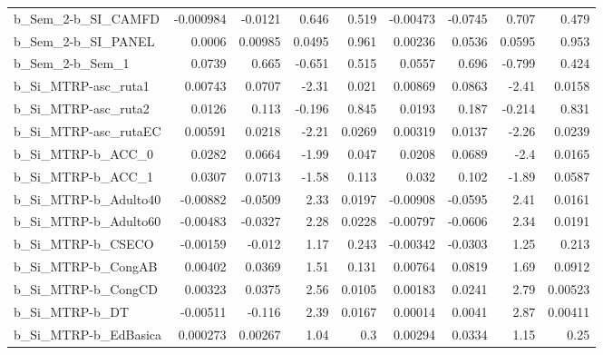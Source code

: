 \begin{tabular}{lrrrrrrrr}
b\_Sem\_2-b\_SI\_CAMFD         &   -0.000984 &      -0.0121 &     0.646 &    0.519 &   -0.00473 &     -0.0745 &        0.707 &         0.479 \\
b\_Sem\_2-b\_SI\_PANEL         &      0.0006 &      0.00985 &    0.0495 &    0.961 &    0.00236 &      0.0536 &       0.0595 &         0.953 \\
b\_Sem\_2-b\_Sem\_1            &      0.0739 &        0.665 &    -0.651 &    0.515 &     0.0557 &       0.696 &       -0.799 &         0.424 \\
b\_Si\_MTRP-asc\_ruta1        &     0.00743 &       0.0707 &     -2.31 &    0.021 &    0.00869 &      0.0863 &        -2.41 &        0.0158 \\
b\_Si\_MTRP-asc\_ruta2        &      0.0126 &        0.113 &    -0.196 &    0.845 &     0.0193 &       0.187 &       -0.214 &         0.831 \\
b\_Si\_MTRP-asc\_rutaEC       &     0.00591 &       0.0218 &     -2.21 &   0.0269 &    0.00319 &      0.0137 &        -2.26 &        0.0239 \\
b\_Si\_MTRP-b\_ACC\_0          &      0.0282 &       0.0664 &     -1.99 &    0.047 &     0.0208 &      0.0689 &         -2.4 &        0.0165 \\
b\_Si\_MTRP-b\_ACC\_1          &      0.0307 &       0.0713 &     -1.58 &    0.113 &      0.032 &       0.102 &        -1.89 &        0.0587 \\
b\_Si\_MTRP-b\_Adulto40       &    -0.00882 &      -0.0509 &      2.33 &   0.0197 &   -0.00908 &     -0.0595 &         2.41 &        0.0161 \\
b\_Si\_MTRP-b\_Adulto60       &    -0.00483 &      -0.0327 &      2.28 &   0.0228 &   -0.00797 &     -0.0606 &         2.34 &        0.0191 \\
b\_Si\_MTRP-b\_CSECO          &    -0.00159 &       -0.012 &      1.17 &    0.243 &   -0.00342 &     -0.0303 &         1.25 &         0.213 \\
b\_Si\_MTRP-b\_CongAB         &     0.00402 &       0.0369 &      1.51 &    0.131 &    0.00764 &      0.0819 &         1.69 &        0.0912 \\
b\_Si\_MTRP-b\_CongCD         &     0.00323 &       0.0375 &      2.56 &   0.0105 &    0.00183 &      0.0241 &         2.79 &       0.00523 \\
b\_Si\_MTRP-b\_DT             &    -0.00511 &       -0.116 &      2.39 &   0.0167 &    0.00014 &      0.0041 &         2.87 &       0.00411 \\
b\_Si\_MTRP-b\_EdBasica       &    0.000273 &      0.00267 &      1.04 &      0.3 &    0.00294 &      0.0334 &         1.15 &          0.25 \\

\end{tabular}
